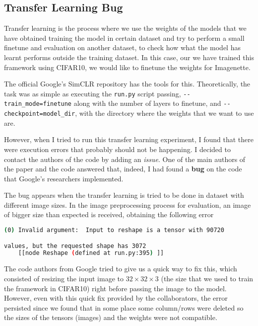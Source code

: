 \subsection{Transfer Learning Bug}

Transfer learning is the process where we use the weights of the models that we have obtained training the model in certain dataset and try to perform a small finetune and evaluation on another dataset, to check how what the model has learnt performs outside the training dataset. In this case, our we have trained this framework using CIFAR10, we would like to finetune the weights for Imagenette.

The official Google's SimCLR repository has the tools for this. Theoretically, the task was as simple as executing the \lstinline{run.py} script passing, \lstinline{--train_mode=finetune} along with the number of layers to finetune,  and \lstinline{--checkpoint=model_dir}, with the directory where the weights that we want to use are.

However, when I tried to run this transfer learning experiment, I found that there were execution errors that probably should not be happening. I decided to contact the authors of the code by adding an \emph{issue}\footnotemark. One of the main authors of the paper and the code answered that, indeed, I had found a \textbf{bug} on the code that Google's researchers implemented.



The bug appears when the transfer learning is tried to be done in dataset with different image sizes. In the image preprocessing process for evaluation, an image of bigger size than expected is received, obtaining the following error 
\begin{lstlisting}[language=bash,caption={Error obtained in transfer learning.}]
(0) Invalid argument:  Input to reshape is a tensor with 90720

values, but the requested shape has 3072
    [[node Reshape (defined at run.py:395) ]]
\end{lstlisting}

The code authors from Google tried to give us a quick way to fix this, which consisted of resizing the input image to $32\times 32 \times 3$ (the size that we used to train the framework in CIFAR10) right before passing the image to the model. However, even with this quick fix provided by the collaborators, the error persisted since we found that in some place some column/rows were deleted so the sizes of the tensors (images) and the weights were not compatible.


